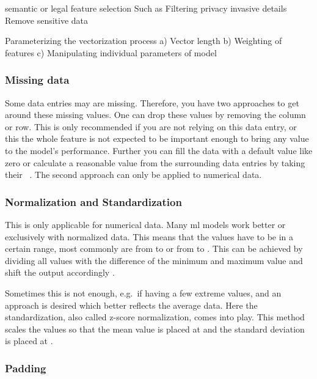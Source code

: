 semantic or legal feature selection
Such as Filtering privacy invasive details
Remove sensitive data

Parameterizing the vectorization process
a) Vector length
b) Weighting of features
c) Manipulating individual parameters of model

\subsubsection{Missing data}
Some data entries may are missing.
Therefore, you have two approaches to get around these missing values.
One can drop these values by removing the column or row.
This is only recommended if you are not relying on this data entry, or this the whole feature is not expected to be important enough to bring any value to the model's performance.
Further you can fill the data with a default value like zero or calculate a reasonable value from the surrounding data entries by taking their ~\cite{duong2021}.
The second approach can only be applied to numerical data.

\subsubsection{Normalization and Standardization}

This is only applicable for numerical data.
Many \gls{ml} models work better or exclusively with normalized data.
This means that the values have to be in a certain range, most commonly are from  to  or from  to .
This can be achieved by dividing all values with the difference of the minimum and maximum value and shift the output accordingly \cite{duong2021}.


Sometimes this is not enough, e.g.\ if having a few extreme values, and an approach is desired which better reflects the average data.
Here the standardization, also called z-score normalization, comes into play.
This method scales the values so that the mean value is placed at  and the standard deviation is placed at .
\subsubsection{Padding}
\label{subsubsec:padding}


